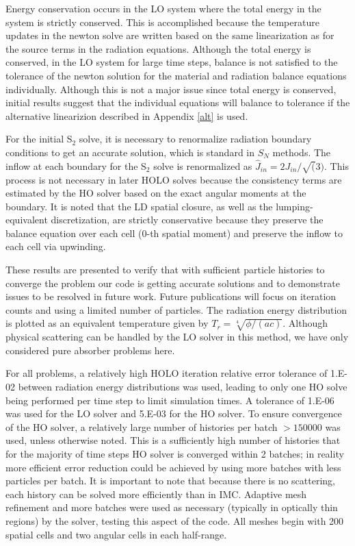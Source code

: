 \documentclass{mc2013}
\begin{document}
Energy conservation occurs in the LO system where the total energy in the system is
strictly conserved.  This is accomplished because the temperature updates in the
newton solve are written based on the same linearization as for the source terms in
the radiation equations.  Although the total energy is conserved, in the LO system
for large time steps, balance is not satisfied to the tolerance of the newton
solution for the material and radiation balance equations individually. Although this
is not a major issue since total energy is conserved, initial
results suggest that the individual equations will balance to tolerance if the
alternative linearizion described in Appendix \ref{alt}   is used.

For the initial S$_2$ solve, it is necessary
to renormalize radiation boundary conditions to get an accurate solution, which is standard in $S_N$ methods.  The
inflow at each boundary for the S$_2$ solve is renormalized as $\hat{J}_{in} =
2J_{in}/\sqrt(3)$.  This
process is not necessary in later HOLO solves because the consistency terms are
estimated by the HO solver based on the exact angular moments at the boundary.  It is noted that the LD spatial closure, as well as the lumping-equivalent discretization, are
strictly conservative because they preserve the balance
equation over each cell ($0$-th spatial moment) and preserve the inflow to each cell
via upwinding.



These results are presented to verify that with sufficient particle histories
to converge the problem our code is getting accurate
solutions and to demonstrate issues to be resolved in future work.  Future
publications will focus on iteration counts and using a limited number of particles.
The radiation energy
distribution is plotted as an equivalent temperature given by $T_r=\sqrt[4]{\phi/(ac)}$.  Although physical scattering
can be handled by the LO solver in this method, we have only considered pure absorber
problems here.


For all problems, a relatively high HOLO iteration relative error tolerance of 1.E-02 between
radiation energy distributions was used, leading to only one HO solve being performed
per time step to limit simulation times.  A tolerance of 1.E-06 was used for the LO
solver and 5.E-03 for the HO solver.  To ensure convergence of the HO solver, a
relatively large number of histories per batch $>150000$ was used,
unless otherwise noted.   This is a sufficiently
high number of histories that for the majority of time steps HO solver is converged within 2
batches; in reality more efficient error reduction could be achieved by using more
batches with less particles per batch.  It is important to note that because there is no scattering, each history can be solved more efficiently than in IMC.  Adaptive mesh refinement and more batches
were used as necessary (typically in optically thin regions) by the
solver, testing this aspect of the code.  All meshes begin with 200 spatial cells and
two angular cells in each half-range.
\end{document}
